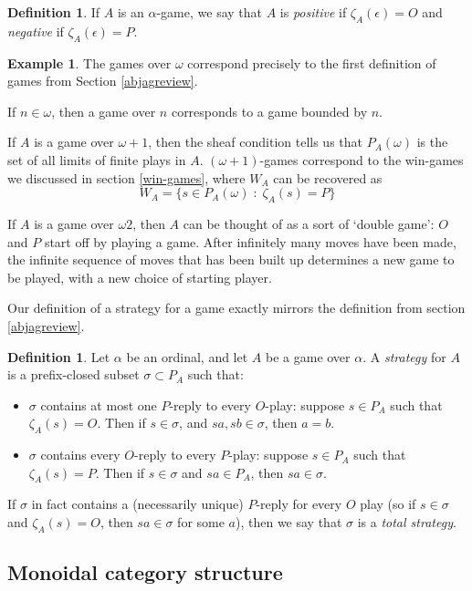 \documentclass[11pt]{article} %
\theoremstyle{plain} %
\theoremstyle{definition} %
\newtheorem{definition}[theorem]{Definition}
\newtheorem{example}[theorem]{Example}
\theoremstyle{exercisestyle}
\newcommand{\suchthat}{\;\colon\;}
\begin{document}
\begin{definition}
  If $A$ is an $\alpha$-game, we say that $A$ is \emph{positive} if $\zeta_A(\epsilon)=O$ and \emph{negative} if $\zeta_A(\epsilon)=P$.
\end{definition}

\begin{example}
  The games over $\omega$ correspond precisely to the first definition of games from Section \ref{abjagreview}.  

  If $n\in\omega$, then a game over $n$ corresponds to a game bounded by $n$.

  If $A$ is a game over $\omega+1$, then the sheaf condition tells us that $P_A(\omega)$ is the set of all limits of finite plays in $A$.  $(\omega+1)$-games correspond to the win-games we discussed in section \ref{win-games}, where $W_A$ can be recovered as
  \[
    W_A=\{s\in P_A(\omega)\suchthat\zeta_A(s)=P\}
  \]

  If $A$ is a game over $\omega 2$, then $A$ can be thought of as a sort of `double game': $O$ and $P$ start off by playing a game.  After infinitely many moves have been made, the infinite sequence of moves that has been built up determines a new game to be played, with a new choice of starting player.
\end{example}

Our definition of a strategy for a game exactly mirrors the definition from section \ref{abjagreview}.
\begin{definition}
  Let $\alpha$ be an ordinal, and let $A$ be a game over $\alpha$.  A \emph{strategy} for $A$ is a prefix-closed subset $\sigma\subset P_A$ such that:
  \begin{itemize}
    \item $\sigma$ contains at most one $P$-reply to every $O$-play: suppose $s\in P_A$ such that $\zeta_A(s)=O$.  Then if $s\in\sigma$, and $sa,sb\in\sigma$, then $a=b$.
    \item $\sigma$ contains every $O$-reply to every $P$-play: suppose $s\in P_A$ such that $\zeta_A(s)=P$.  Then if $s\in\sigma$ and $sa\in P_A$, then $sa\in\sigma$.  
  \end{itemize}
  If $\sigma$ in fact contains a (necessarily unique) $P$-reply for every $O$ play (so if $s\in\sigma$ and $\zeta_A(s)=O$, then $sa\in\sigma$ for some $a$), then we say that $\sigma$ is a \emph{total strategy}.  
\end{definition}

\subsection{Monoidal category structure}
\end{document}
